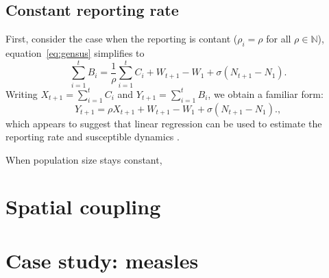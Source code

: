 \documentclass{article}
\begin{document}
\subsection*{Constant reporting rate}

First, consider the case when the reporting is contant ($\rho_i = \rho$ for all $\rho \in \mathbb{N}$), equation~\ref{eq:gensus} simplifies to 
\begin{equation}
\sum_{i=1}^t B_i = \frac{1}{\rho} \sum_{i=1}^t C_i + W_{t+1} - W_1 + \sigma (N_{t+1} - N_1).
\end{equation}
Writing $X_{t+1} = \sum_{i=1}^t C_i$ and $Y_{t+1} = \sum_{i=1}^t B_i$, we obtain a familiar form:
\begin{equation}
Y_{t+1} = \rho X_{t+1} + W_{t+1} - W_1 + \sigma (N_{t+1} - N_1).,
\end{equation}
which appears to suggest that linear regression can be used to estimate the reporting rate and susceptible dynamics \citep{finkenstadt2000time}.

When population size stays constant, 






\section{Spatial coupling}

\section{Case study: measles}



\end{document}
